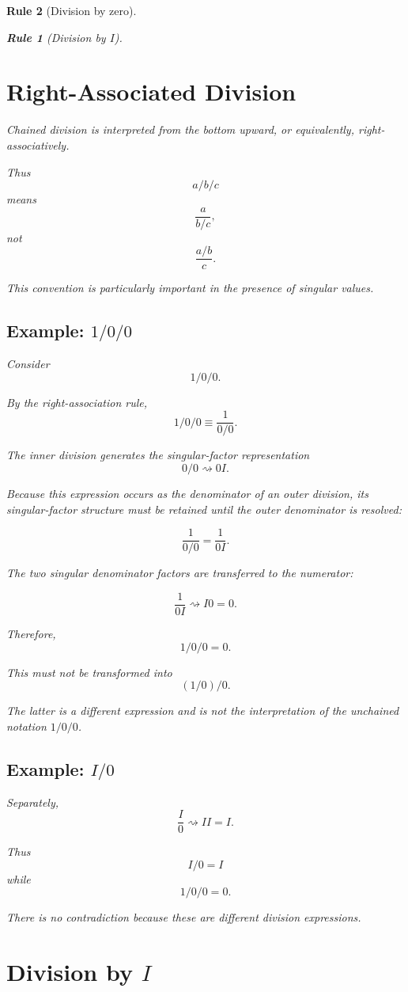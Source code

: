 \documentclass[11pt,a4paper]{article}
\newtheorem{rulethm}{Rule}[section]
\begin{document}
\begin{rulethm}[Division by zero]
\begin{rulethm}[Division by $I$]
\section{Right-Associated Division}

Chained division is interpreted from the bottom upward, or equivalently,
right-associatively.

Thus
\[
a/b/c
\]
means
\[
\frac{a}{b/c},
\]
not
\[
\frac{a/b}{c}.
\]

This convention is particularly important in the presence of singular
values.

\subsection{Example: $1/0/0$}

Consider
\[
1/0/0.
\]

By the right-association rule,
\[
1/0/0
\equiv
\frac{1}{0/0}.
\]

The inner division generates the singular-factor representation
\[
0/0\rightsquigarrow0I.
\]

Because this expression occurs as the denominator of an outer division, its
singular-factor structure must be retained until the outer denominator is
resolved:

\[
\frac{1}{0/0}
=
\frac{1}{0I}.
\]

The two singular denominator factors are transferred to the numerator:

\[
\frac{1}{0I}
\rightsquigarrow
I0
=
0.
\]

Therefore,
\[
\boxed{1/0/0=0}.
\]

This must not be transformed into
\[
(1/0)/0.
\]

The latter is a different expression and is not the interpretation of the
unchained notation $1/0/0$.

\subsection{Example: $I/0$}

Separately,
\[
\frac{I}{0}
\rightsquigarrow II
=I.
\]

Thus
\[
\boxed{I/0=I}
\]
while
\[
\boxed{1/0/0=0}.
\]

There is no contradiction because these are different division expressions.

\section{Division by $I$}


\end{rulethm}
\end{rulethm}
\end{document}
